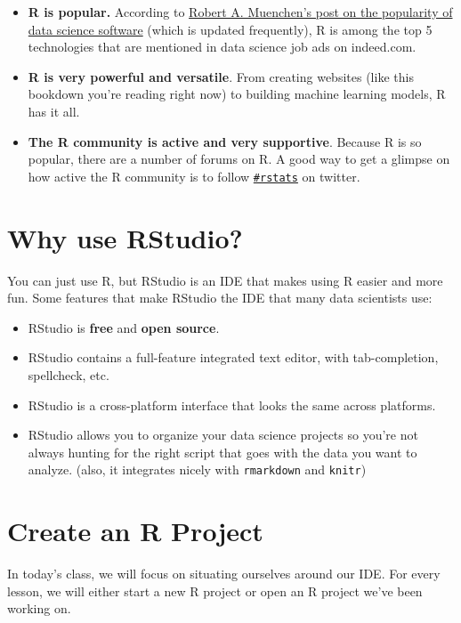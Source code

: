 \documentclass[
]{book}
\begin{document}
\begin{itemize}
\item
  \textbf{R is popular.} According to \href{http://r4stats.com/articles/popularity/}{Robert A. Muenchen's post on the popularity of data science software} (which is updated frequently), R is among the top 5 technologies that are mentioned in data science job ads on indeed.com.
\item
  \textbf{R is very powerful and versatile}. From creating websites (like this bookdown you're reading right now) to building machine learning models, R has it all.
\item
  \textbf{The R community is active and very supportive}. Because R is so popular, there are a number of forums on R. A good way to get a glimpse on how active the R community is to follow \href{https://twitter.com/search?q=\%23rstats}{\texttt{\#rstats}} on twitter.
\end{itemize}

\hypertarget{why-use-rstudio}{%
\section{Why use RStudio?}\label{why-use-rstudio}}

You can just use R, but RStudio is an IDE that makes using R easier and more fun. Some features that make RStudio the IDE that many data scientists use:

\begin{itemize}
\item
  RStudio is \textbf{free} and \textbf{open source}.
\item
  RStudio contains a full-feature integrated text editor, with tab-completion, spellcheck, etc.
\item
  RStudio is a cross-platform interface that looks the same across platforms.
\item
  RStudio allows you to organize your data science projects so you're not always hunting for the right script that goes with the data you want to analyze. (also, it integrates nicely with \texttt{rmarkdown} and \texttt{knitr})
\end{itemize}

\hypertarget{create-an-r-project}{%
\section{Create an R Project}\label{create-an-r-project}}

In today's class, we will focus on situating ourselves around our IDE. For every lesson, we will either start a new R project or open an R project we've been working on.
\end{document}
